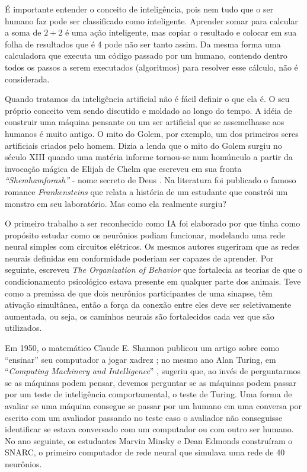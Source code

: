 \documentclass[
]{book}
\begin{document}
É importante entender o conceito de inteligência, pois nem tudo que o ser humano faz pode ser classificado como inteligente. Aprender somar para calcular a soma de \(2+2\) é uma ação inteligente, mas copiar o resultado e colocar em sua folha de resultados que é 4 pode não ser tanto assim. Da mesma forma uma calculadora que executa um código passado por um humano, contendo dentro todos os passos a serem executados (algoritmos) para resolver esse cálculo, não é considerada.

Quando tratamos da inteligência artificial não é fácil definir o que ela é. O seu próprio conceito vem sendo discutido e moldado ao longo do tempo. A idéia de construir uma máquina pensante ou um ser artificial que se assemelhasse aos humanos é muito antigo. O mito do Golem, por exemplo, um dos primeiros seres artificiais criados pelo homem. Dizia a lenda que o mito do Golem surgiu no século XIII quando uma matéria informe tornou-se num homúnculo a partir da invocação mágica de Elijah de Chelm que escreveu em sua fronta \emph{``Shemhamforash''} - nome secreto de Deus \citep{moser2006golem}. Na literatura foi publicado o famoso romance \emph{Frankensteins} \citep{shelley1818frankenstein} que relata a história de um estudante que constrói um monstro em seu laboratório. Mas como ela realmente surgiu?

O primeiro trabalho a ser reconhecido como IA foi elaborado por \citet{mcculloch1943logical} que tinha como propósito estudar como os neurônios podiam funcionar, modelando uma rede neural simples com circuitos elétricos. Os mesmos autores sugeriram que as redes neurais definidas em conformidade poderiam ser capazes de aprender. Por seguinte, \citet{hebb1949organization} escreveu \emph{The Organization of Behavior} que fortalecia as teorias de que o condicionamento psicológico estava presente em qualquer parte dos animais. Teve como a premissa de que dois neurônios participantes de uma sinapse, têm ativação simultânea, então a força da conexão entre eles deve ser seletivamente aumentada, ou seja, os caminhos neurais são fortalecidos cada vez que são utilizados.

Em 1950, o matemático Claude E. Shannon publicou um artigo sobre como ``ensinar'' seu computador a jogar xadrez \citep{shannon1950xxii}; no mesmo ano Alan Turing, em ``\emph{Computing Machinery and Intelligence}'' \citep{turing1950computing},
sugeriu que, ao invés de perguntarmos se as máquinas podem pensar, devemos perguntar se as máquinas podem passar por um teste de inteligência comportamental, o teste de Turing. Uma forma de avaliar se uma máquina consegue se passar por um humano em uma conversa por escrito com um avaliador passando no teste caso o avaliador não conseguisse identificar se estava conversado com um computador ou com outro ser humano. No ano seguinte, os estudantes Marvin Minsky e Dean Edmonds construíram o SNARC, o primeiro computador de rede neural que simulava uma rede de 40 neurônios.
\end{document}
